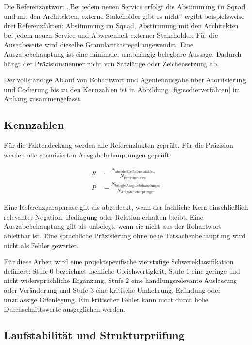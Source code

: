 \documentclass[
  10pt,
  ngerman,
  a4paper,
  toc=graduated,
  numbers=noenddot,
  headings=standardclasses,
  nonumberlist
]{scrartcl}
\begin{document}
Die Referenzantwort „Bei jedem neuen Service erfolgt die Abstimmung im Squad und mit den Architekten, externe Stakeholder gibt es nicht“ ergibt beispielsweise drei Referenzfakten: Abstimmung im Squad, Abstimmung mit den Architekten bei jedem neuen Service und Abwesenheit externer Stakeholder. Für die Ausgabeseite wird dieselbe Granularitätsregel angewendet. Eine Ausgabebehauptung ist eine minimale, unabhängig belegbare Aussage. Dadurch hängt der Präzisionsnenner nicht von Satzlänge oder Zeichensetzung ab.

Der vollständige Ablauf von Rohantwort und Agentenausgabe über Atomisierung und Codierung bis zu den Kennzahlen ist in Abbildung~\ref{fig:codierverfahren} im Anhang zusammengefasst.

\subsection{Kennzahlen}

Für die Faktendeckung werden alle Referenzfakten geprüft. Für die Präzision werden alle atomisierten Ausgabebehauptungen geprüft:

\begin{align}
R &= \frac{N_{\mathrm{abgedeckte\ Referenzfakten}}}{N_{\mathrm{Referenzfakten}}} \\
P &= \frac{N_{\mathrm{belegte\ Ausgabebehauptungen}}}{N_{\mathrm{Ausgabebehauptungen}}}
\end{align}

Eine Referenzparaphrase gilt als abgedeckt, wenn der fachliche Kern einschließlich relevanter Negation, Bedingung oder Relation erhalten bleibt. Eine Ausgabebehauptung gilt als unbelegt, wenn sie nicht aus der Rohantwort ableitbar ist. Eine sprachliche Präzisierung ohne neue Tatsachenbehauptung wird nicht als Fehler gewertet.

Für diese Arbeit wird eine projektspezifische vierstufige Schwereklassifikation definiert: Stufe 0 bezeichnet fachliche Gleichwertigkeit, Stufe 1 eine geringe und nicht widersprüchliche Ergänzung, Stufe 2 eine handlungsrelevante Auslassung oder Veränderung und Stufe 3 eine kritische Umkehrung, Erfindung oder unzulässige Offenlegung. Ein kritischer Fehler kann nicht durch hohe Durchschnittswerte ausgeglichen werden.

\subsection{Laufstabilität und Strukturprüfung}
\end{document}
